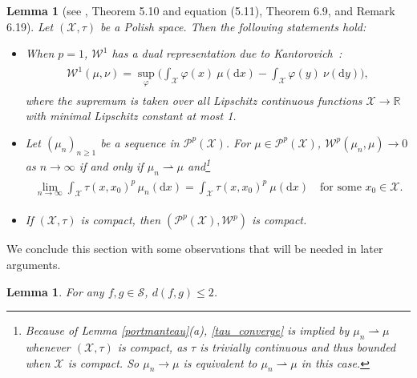 \documentclass[11pt,reqno]{amsart}
\numberwithin{equation}{section}
\newtheorem{lemma}[thm]{Lemma}
\theoremstyle{definition}
\begin{document}
\begin{lemma}[see \cite{villani09}, Theorem 5.10 and equation (5.11), Theorem 6.9, and Remark 6.19] \label{wasserstein_compact}
Let $({\mathcal{X}},\tau)$ be a Polish space.
Then the following statements hold:
\begin{itemize}
\item[(a)] When $p = 1$, ${\mathcal{W}}^1$ has a dual representation due to Kantorovich~\cite{kantorovich42}:
{\begin{align} \begin{split} {
{\mathcal{W}}^1(\mu,\nu) = \sup_{\varphi} \biggl(\int_{\mathcal{X}} {\varphi}(x)\ \mu({\mathrm{d}} x) - \int_{\mathcal{X}} {\varphi}(y)\ \nu({\mathrm{d}} y)\biggr), \label{kantorovich}
} \end{split} \end{align}}
where the supremum is taken over all Lipschitz continuous functions ${\mathcal{X}} \to {\mathbb{R}}$ with minimal Lipschitz constant at most 1.
\item[(b)] Let $(\mu_n)_{n \geq 1}$ be a sequence in ${\mathcal{P}}^p({\mathcal{X}})$. For $\mu \in {\mathcal{P}}^p({\mathcal{X}})$, ${\mathcal{W}}^p(\mu_n,\mu) \to 0$ as $n \to \infty$ if and only if $\mu_n \rightharpoonup \mu$ and\footnote{Because of Lemma \ref{portmanteau}(a), \eqref{tau_converge} is implied by $\mu_n \rightharpoonup \mu$ whenever $({\mathcal{X}},\tau)$ is compact, as $\tau$ is trivially continuous and thus bounded when ${\mathcal{X}}$ is compact.  So $\mu_n \to \mu$ is equivalent to $\mu_n \rightharpoonup \mu$ in this case.}
{\begin{align} \begin{split} {
\lim_{n \to \infty} \int_{\mathcal{X}} \tau(x,x_0)^{p}\, \mu_n({\mathrm{d}} x) = \int_{\mathcal{X}} \tau(x,x_0)^{p}\ \mu({\mathrm{d}} x) \quad \text{for some $x_0 \in {\mathcal{X}}$}. \label{tau_converge}
} \end{split} \end{align}}
\item[(c)] If $({\mathcal{X}},\tau)$ is compact, then $({\mathcal{P}}^p({\mathcal{X}}),{\mathcal{W}}^p)$ is compact.
\end{itemize}
\end{lemma}

We conclude this section with some observations that will be needed in later arguments.

\begin{lemma} \label{trivial_bound}
For any $f,g \in {\mathcal{S}}$, $d(f,g) \leq 2$.
\end{lemma}
\end{document}
